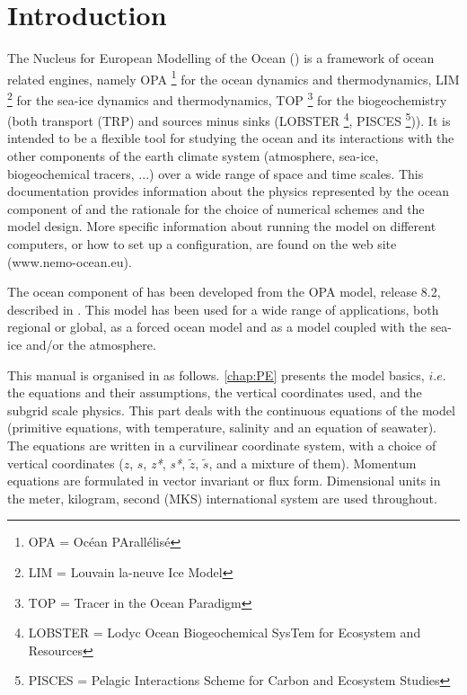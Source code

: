 \documentclass[../main/NEMO_manual]{subfiles}
\begin{document}

\chapter{Introduction}

The Nucleus for European Modelling of the Ocean (\NEMO) is a framework of ocean related engines,
namely OPA \footnote{OPA = Oc\'{e}an PArall\'{e}lis\'{e}} for the ocean dynamics and thermodynamics,
LIM \footnote{LIM = Louvain la-neuve Ice Model} for the sea-ice dynamics and thermodynamics,
TOP \footnote{TOP = Tracer in the Ocean Paradigm} for the biogeochemistry (both transport (TRP) and sources 
minus sinks (LOBSTER \footnote{LOBSTER = Lodyc Ocean Biogeochemical SysTem for Ecosystem and Resources},
PISCES \footnote{PISCES = Pelagic Interactions Scheme for Carbon and Ecosystem Studies})).
It is intended to be a flexible tool for studying the ocean and its interactions with the other components of
the earth climate system (atmosphere, sea-ice, biogeochemical tracers, ...) over
a wide range of space and time scales. 
This documentation provides information about the physics represented by the ocean component of \NEMO and
the rationale for the choice of numerical schemes and the model design.
More specific information about running the model on different computers, or how to set up a configuration,
are found on the \NEMO web site (www.nemo-ocean.eu). 

The ocean component of \NEMO has been developed from the OPA model, release 8.2, described in \citet{Madec1998}.
This model has been used for a wide range of applications, both regional or global,
as a forced ocean model and as a model coupled with the sea-ice and/or the atmosphere.  

This manual is organised in as follows.
\autoref{chap:PE} presents the model basics, $i.e.$ the equations and their assumptions,
the vertical coordinates used, and the subgrid scale physics.
This part deals with the continuous equations of the model
(primitive equations, with temperature, salinity and an equation of seawater).
The equations are written in a curvilinear coordinate system, with a choice of vertical coordinates
($z$, $s$, \textit{z*}, \textit{s*}, $\tilde{z}$, $\tilde{s}$, and a mixture of them).
Momentum equations are formulated in vector invariant or flux form.
Dimensional units in the meter, kilogram, second (MKS) international system are used throughout.
\end{document}
